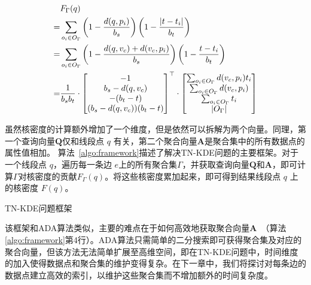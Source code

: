 \begin{align}
	\label{eq:aggregate}
	&F_\Gamma(q) \notag \\
	=& \sum_{o_i \in O_\Gamma}
	\left(1 - \frac{d(q,p_i)}{b_s}\right)
	\left(1 - \frac{\vert t - t_i \vert}{b_t}\right) \notag \\
	=& \sum_{o_i \in O_\Gamma}
	\left(1-\frac{d(q, v_c) + d(v_c, p_i)}{b_s}\right)
	\left(1-\frac{t - t_i}{b_t}\right) \\
	=& \frac{1}{b_sb_t} \cdot 
	\begin{bmatrix}
		-1 \\
		b_s-d(q, v_c) \\
		-(b_t-t) \\
		(b_s-d(q, v_c))(b_t-t) \\
	\end{bmatrix}^\top \cdot
	\begin{bmatrix}
		\sum_{o_i \in O_\Gamma} d(v_c,p_i)t_i \\
		\sum_{o_i \in O_\Gamma} d(v_c,p_i) \\
		\sum_{o_i \in O_\Gamma} t_i \\
		\vert O_\Gamma \vert 
	\end{bmatrix} \notag
\end{align}

虽然核密度的计算额外增加了一个维度，但是依然可以拆解为两个向量。同理，第一个查询向量$\mathbf{Q}$仅和线段点 $q$ 有关，第二个聚合向量$\mathbf{A}$是聚合集中的所有数据点的属性值相加。
算法~\ref{algo:framework}描述了解决TN-KDE问题的主要框架。对于一个线段点 $q$，遍历每一条边 $e$上的所有聚合集$\Gamma$，并获取查询向量$\mathbf{Q}$和$\mathbf{A}$，即可计算$\Gamma$对核密度的贡献$F_\Gamma(q)$。将这些核密度累加起来，即可得到结果线段点 $q$ 上的核密度 $F(q)$。

\begin{algorithm}[h]
	\caption{TN-KDE问题框架}
	\label{algo:framework}
	\DontPrintSemicolon
	
\end{algorithm}

该框架和ADA算法类似，主要的难点在于如何高效地获取聚合向量$\mathbf{A}$~（算法\ref{algo:framework}第4行）。ADA算法只需简单的二分搜索即可获得聚合集及对应的聚合向量，但该方法无法简单扩展至高维空间，即在TN-KDE问题中，时间维度的加入使得数据点和聚合集的维护变得复杂。在下一章中，我们将探讨对每条边的数据点建立高效的索引，以维护这些聚合集而不增加额外的时间复杂度。